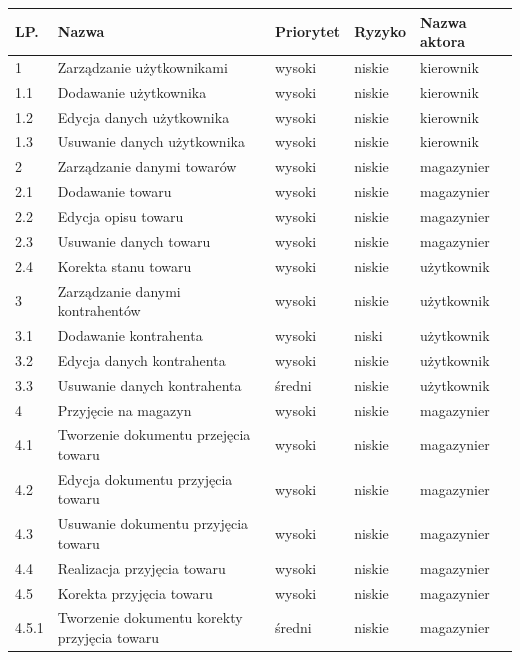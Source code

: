 \begin{table}[ht]
	 \begin{center}
	    \begin{tabular}{| l | l | l | l | l |}%
	    	\hline
		    \textbf{LP.} & \textbf{Nazwa}  & \textbf{Priorytet} & \textbf{Ryzyko} &
		    \textbf{Nazwa aktora} \\
		    \hline
			1 & Zarządzanie użytkownikami & wysoki & niskie & kierownik \\
		    1.1 & Dodawanie użytkownika & wysoki & niskie & kierownik \\
		    1.2 & Edycja danych użytkownika & wysoki & niskie & kierownik \\ 	
		    1.3 & Usuwanie danych użytkownika & wysoki &niskie & kierownik \\
		    \hline
		    2 & Zarządzanie danymi towarów & wysoki & niskie & magazynier \\
		    2.1 & Dodawanie towaru & wysoki &  niskie & magazynier \\
		    2.2 & Edycja opisu towaru & wysoki & niskie & magazynier \\
		    2.3 & Usuwanie danych towaru & wysoki & niskie & magazynier \\
            2.4 & Korekta stanu towaru & wysoki & niskie & użytkownik \\
		    \hline
		   	3 & Zarządzanie danymi kontrahentów & wysoki & niskie & użytkownik \\
		   	3.1 & Dodawanie kontrahenta & wysoki & niski & użytkownik \\
		   	3.2 & Edycja danych kontrahenta & wysoki & niskie & użytkownik \\
		   	3.3 & Usuwanie danych kontrahenta & średni & niskie & użytkownik \\
		   	\hline
            4 & Przyjęcie na magazyn & wysoki & niskie & magazynier \\
		   	4.1 & Tworzenie dokumentu przejęcia towaru & wysoki & niskie & magazynier \\
		   	4.2 & Edycja dokumentu przyjęcia towaru & wysoki & niskie & magazynier \\
		   	4.3 & Usuwanie dokumentu przyjęcia towaru & wysoki & niskie & magazynier \\
		   	4.4 & Realizacja przyjęcia towaru & wysoki & niskie & magazynier \\
		   	4.5 & Korekta przyjęcia towaru & wysoki & niskie & magazynier \\
            4.5.1 & Tworzenie dokumentu korekty przyjęcia towaru & średni & niskie & magazynier \\

\end{tabular}
\end{center}
\end{table}
